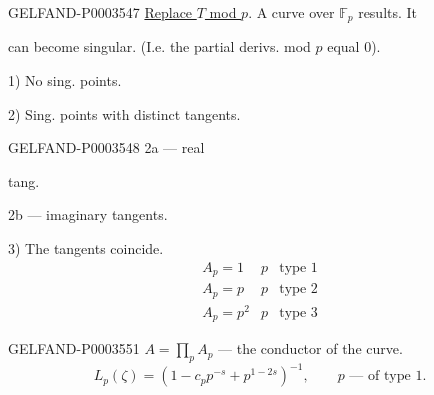 \begin{GelfandAdjacentEvidence}{GELFAND-P000354}{7}
\uline{Replace $T$ mod $p$}. A curve over $\mathbb F_p$ results. It
\end{GelfandAdjacentEvidence}

can become singular.
(I.e. the partial derivs. mod $p$ equal $0$).

1) No sing. points.

2) Sing. points with distinct tangents.

\begin{GelfandAdjacentEvidence}{GELFAND-P000354}{8}
2a --- real
\end{GelfandAdjacentEvidence}

tang.

2b --- imaginary tangents.

3) The tangents coincide.
\begin{equation*}\begin{array}{lll}A_p=1&p&\text{type 1}\\A_p=p&p&\text{type 2}\\A_p=p^2&p&\text{type 3}\end{array}\end{equation*}


\begin{GelfandAdjacentEvidence}{GELFAND-P000355}{1}
$A=\prod_p A_p$ --- the conductor of the curve.
\begin{equation*}L_p (\zeta)=(1-c_pp^{-s}+p^{1-2s})^{-1},\qquad p\text{ --- of type 1.}\end{equation*}
\end{GelfandAdjacentEvidence}


